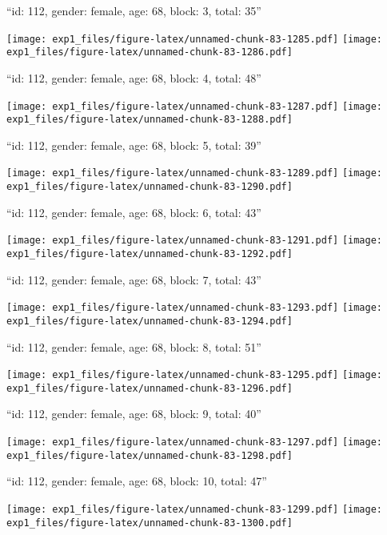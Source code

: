 \documentclass[11pt,,]{article}
\begin{document}
\newpage
[1] 

``id: 112, gender: female, age: 68, block: 3, total: 35''

\texttt{[image: exp1\_files/figure-latex/unnamed-chunk-83-1285.pdf]}
\texttt{[image: exp1\_files/figure-latex/unnamed-chunk-83-1286.pdf]}

\newpage
[1] 

``id: 112, gender: female, age: 68, block: 4, total: 48''

\texttt{[image: exp1\_files/figure-latex/unnamed-chunk-83-1287.pdf]}
\texttt{[image: exp1\_files/figure-latex/unnamed-chunk-83-1288.pdf]}

\newpage
[1] 

``id: 112, gender: female, age: 68, block: 5, total: 39''

\texttt{[image: exp1\_files/figure-latex/unnamed-chunk-83-1289.pdf]}
\texttt{[image: exp1\_files/figure-latex/unnamed-chunk-83-1290.pdf]}

\newpage
[1] 

``id: 112, gender: female, age: 68, block: 6, total: 43''

\texttt{[image: exp1\_files/figure-latex/unnamed-chunk-83-1291.pdf]}
\texttt{[image: exp1\_files/figure-latex/unnamed-chunk-83-1292.pdf]}

\newpage
[1] 

``id: 112, gender: female, age: 68, block: 7, total: 43''

\texttt{[image: exp1\_files/figure-latex/unnamed-chunk-83-1293.pdf]}
\texttt{[image: exp1\_files/figure-latex/unnamed-chunk-83-1294.pdf]}

\newpage
[1] 

``id: 112, gender: female, age: 68, block: 8, total: 51''

\texttt{[image: exp1\_files/figure-latex/unnamed-chunk-83-1295.pdf]}
\texttt{[image: exp1\_files/figure-latex/unnamed-chunk-83-1296.pdf]}

\newpage
[1] 

``id: 112, gender: female, age: 68, block: 9, total: 40''

\texttt{[image: exp1\_files/figure-latex/unnamed-chunk-83-1297.pdf]}
\texttt{[image: exp1\_files/figure-latex/unnamed-chunk-83-1298.pdf]}

\newpage
[1] 

``id: 112, gender: female, age: 68, block: 10, total: 47''

\texttt{[image: exp1\_files/figure-latex/unnamed-chunk-83-1299.pdf]}
\texttt{[image: exp1\_files/figure-latex/unnamed-chunk-83-1300.pdf]}
\end{document}
